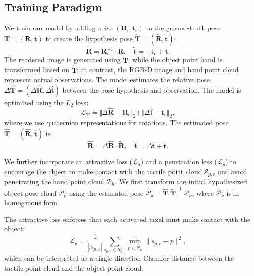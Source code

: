 \documentclass[11pt, a4paper, logo, twocolumn]{brown}
\begin{document}
\subsection{Training Paradigm}
We train our model by adding noise $(\mathbf{R}_\epsilon, \mathbf{t}_\epsilon)$ to the ground-truth pose $\mathbf{T}=(\mathbf{R}, \mathbf{t})$ to create the hypothesis pose $\widetilde{\mathbf{T}}=(\widetilde{\mathbf{R}},\widetilde{\mathbf{t}})$:
\begin{equation}
    \widetilde{\mathbf{R}} = \mathbf{R}_\epsilon^{-1} \cdot \mathbf{R}, \quad
    \widetilde{\mathbf{t}} = -\mathbf{t}_\epsilon + \mathbf{t}.   
\end{equation}
The rendered image is generated using $\widetilde{\mathbf{T}}$, while the object point hand is transformed based on $\widetilde{\mathbf{T}}$; in contrast, the RGB-D image and hand point cloud represent actual observations.
The model estimates the relative pose $\Delta\widehat{\mathbf{T}}=(\Delta\widehat{\mathbf{R}}, \Delta\widehat{\mathbf{t}})$ between the pose hypothesis and observation.
The model is optimized using the $L_2$ loss:
\begin{equation}
    \mathcal{L}_\mathbf{T} = \Vert \Delta\widehat{\mathbf{R}} - \mathbf{R}_\epsilon \Vert_2 + \Vert \Delta\widehat{\mathbf{t}} - \mathbf{t}_\epsilon \Vert_2,
\end{equation}
where we use quaternion representations for rotations. 
The estimated pose $\widehat{\mathbf{T}}=(\widehat{\mathbf{R}}, \widehat{\mathbf{t}})$ is:
\begin{equation}
    \widehat{\mathbf{R}} = \Delta\widehat{\mathbf{R}} \cdot \widetilde{\mathbf{R}}, \quad
    \widehat{\mathbf{t}} = \Delta\widehat{\mathbf{t}} + \widetilde{\mathbf{t}} .
\end{equation}

We further incorporate an attractive loss ($\mathcal{L}_a$) and a penetration loss ($\mathcal{L}_p$) to encourage the object to make contact with the tactile point cloud $\mathcal{S}_{p, c}$ and avoid penetrating the hand point cloud $\mathcal{P}_h$.
We first transform the initial hypothesized object pose cloud $\mathcal{P}_o$ using the estimated pose ${\widehat{\mathcal{P}}_o = \widehat{\mathbf{T}} \; \widetilde{\mathbf{T}}^{-1} \; \mathcal{P}_o}$, where $\mathcal{P}_o$ is in homogenous form.

The attractive loss enforces that each activated taxel must make contact with the object:
\begin{equation}
    \mathcal{L}_a = \frac{1}{|\mathcal{S}_{p, c}|} \sum_{s_{p, c} \in \mathcal{S}_{p, c}} \min_{p \in \widehat{\mathcal{P}}_o} \|s_{p, c} - p\|^2,
\end{equation}
 which can be interpreted as a single-direction Chamfer distance between the tactile point cloud and the object point cloud.
\end{document}
